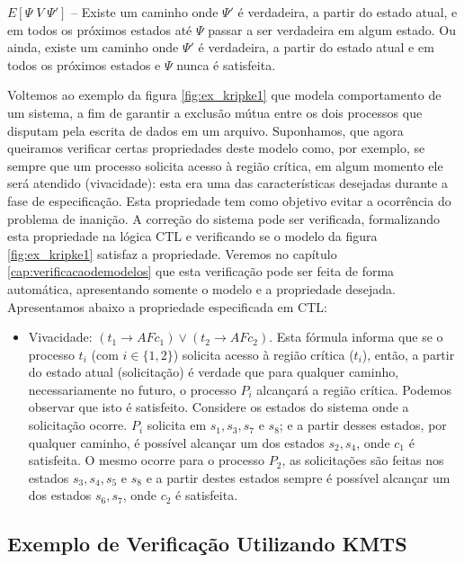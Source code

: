 \documentclass[normaltoc,capchap,capsec,times]{abnt}
\begin{document}
$E[\Psi \;V \;\Psi']$ -- Existe um caminho onde $\Psi'$ é verdadeira, a partir do estado atual, e em todos os próximos estados até $\Psi$ passar a ser verdadeira em algum estado. Ou ainda, existe um caminho onde $\Psi'$ é verdadeira, a partir do estado atual e em todos os próximos estados e $\Psi$ nunca é satisfeita.

Voltemos ao exemplo da figura \ref{fig:ex_kripke1} que modela comportamento de um sistema, a fim de garantir a exclusão mútua entre os dois processos que disputam pela escrita de dados em um arquivo. Suponhamos, que agora queiramos verificar certas propriedades deste modelo como, por exemplo, se sempre que um processo solicita acesso à região crítica, em algum momento ele será atendido (vivacidade): esta era uma das características desejadas durante a fase de especificação. Esta propriedade tem como objetivo evitar a ocorrência do problema de inanição. A correção do sistema pode ser verificada, formalizando esta propriedade na lógica CTL e verificando se o modelo da figura \ref{fig:ex_kripke1} satisfaz a propriedade. Veremos no capítulo \ref{cap:verificacaodemodelos} que esta verificação pode ser feita de forma automática, apresentando somente o modelo e a propriedade desejada. Apresentamos abaixo a propriedade especificada em CTL:

\begin{itemize}
	\item Vivacidade: $ (t_1 \to AF c_1) \vee (t_2 \to AF c_2) $. Esta fórmula informa que se o processo $t_i$ (com $i \in \{1,2\}$) solicita acesso à região crítica ($t_i$), então, a partir do estado atual (solicitação) é verdade que para qualquer caminho, necessariamente no futuro, o processo $P_i$ alcançará a região crítica. Podemos observar que isto é satisfeito. Considere os estados do sistema onde a solicitação ocorre. $P_i$ solicita em $s_1,s_3,s_7$ e $s_8$; e a partir desses estados, por qualquer caminho, é possível alcançar um dos estados $s_2,s_4$, onde $c_1$ é satisfeita. O mesmo ocorre para o processo $P_2$, as solicitações são feitas nos estados $s_3,s_4,s_5$ e $s_8$ e a partir destes estados sempre é possível alcançar um dos estados $s_6,s_7$, onde $c_2$ é satisfeita.
		
\end{itemize}

\subsection{Exemplo de Verificação Utilizando KMTS}
\end{document}
